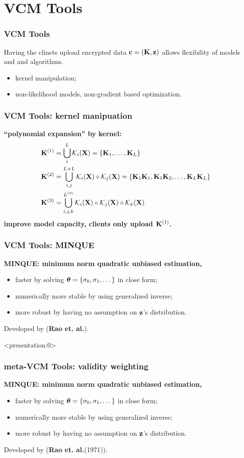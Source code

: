 \documentclass{beamer}
\newcommand{\kn}{\mathcal{K}}                         %
\begin{document}
\section{VCM Tools}
\begin{frame}\frametitle{VCM Tools}
  Having the clinets upload encrypted data $\mathbf{c}=(\mathbf{K}, \mathbf{z})$ allows
  flexibility of models and and algorithms.
  \begin{itemize}
  \item kernel manipulation;
  \item non-likelihood models, non-gradient based optimization.
  \end{itemize}
\end{frame}
\begin{frame}\frametitle{VCM Tools: kernel manipuation}
  \textbf{``polynomial expansion'' by kernel:}
  \begin{align*}
    \xk^{(1)} & = \bigcup_{i}^L \kn_i(\xx) = \{\xk_1, \dots, \xk_L\} \\
    \xk^{(2)} & = \bigcup_{i,j}^{L \times L} \kn_i(\xx) \circ \kn_j(\xx) = \{\xk_1\xk_1, \xk_1\xk_2, \dots, \xk_L\xk_L\} \\
    \xk^{(3)} & = \bigcup_{i,j,k}^{L^{(3)}}  \kn_i(\xx) \circ \kn_j(\xx) \circ \kn_k(\xx)
  \end{align*}
  {\color{blue}\textbf{improve model capacity, clients only upload $\mathbf{K}^{(1)}$.}}
\end{frame}
\begin{frame} %
  \frametitle{VCM Tools: \textbf{MINQUE}} %
  \textbf{MINQUE: minimum norm quadratic unbiased estimation,}
  \begin{itemize}
  \item faster by solving $\boldsymbol{\theta}=\{\sigma_0, \sigma_1, \dots \}$ in
    close form;
  \item numerically more stable by using generalized inverse;
  \item more robust by having no assumption on $\mathbf{z}$'s distribution.
  \end{itemize}
  Developed by (\textbf{Rao et. al.}).
\end{frame}
\begin{frame}<presentation:0> %
  \frametitle{meta-VCM Tools: \textbf{validity weighting}} %
  \textbf{MINQUE: minimum norm quadratic unbiased estimation,}
  \begin{itemize}
  \item faster by solving $\boldsymbol{\theta}=\{\sigma_0, \sigma_1, \dots \}$ in
    close form;
  \item numerically more stable by using generalized inverse;
  \item more robust by having no assumption on $\mathbf{z}$'s distribution.
  \end{itemize}
  Developed by (\textbf{Rao et. al.}(1971)).
\end{frame}
\end{document}
